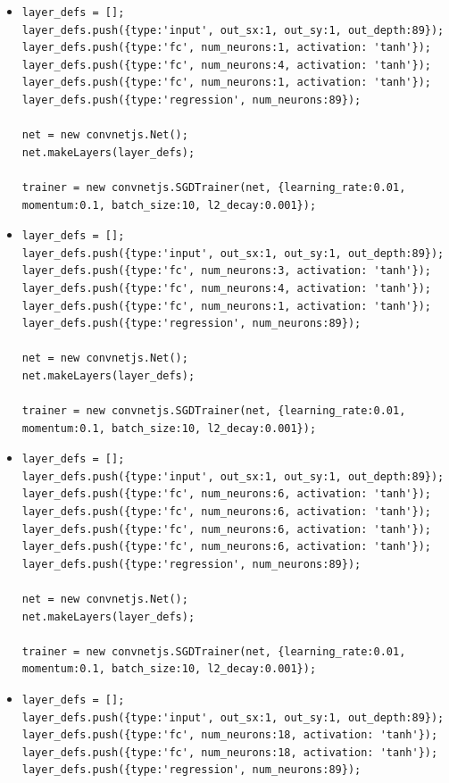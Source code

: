 \begin{itemize}
\item \begin{verbatim}
layer_defs = [];
layer_defs.push({type:'input', out_sx:1, out_sy:1, out_depth:89});
layer_defs.push({type:'fc', num_neurons:1, activation: 'tanh'});
layer_defs.push({type:'fc', num_neurons:4, activation: 'tanh'});
layer_defs.push({type:'fc', num_neurons:1, activation: 'tanh'});
layer_defs.push({type:'regression', num_neurons:89});

net = new convnetjs.Net();
net.makeLayers(layer_defs);

trainer = new convnetjs.SGDTrainer(net, {learning_rate:0.01, 
momentum:0.1, batch_size:10, l2_decay:0.001});
\end{verbatim}

\item \begin{verbatim}
layer_defs = [];
layer_defs.push({type:'input', out_sx:1, out_sy:1, out_depth:89});
layer_defs.push({type:'fc', num_neurons:3, activation: 'tanh'});
layer_defs.push({type:'fc', num_neurons:4, activation: 'tanh'});
layer_defs.push({type:'fc', num_neurons:1, activation: 'tanh'});
layer_defs.push({type:'regression', num_neurons:89});

net = new convnetjs.Net();
net.makeLayers(layer_defs);

trainer = new convnetjs.SGDTrainer(net, {learning_rate:0.01, 
momentum:0.1, batch_size:10, l2_decay:0.001});
\end{verbatim}


\item \begin{verbatim}
layer_defs = [];
layer_defs.push({type:'input', out_sx:1, out_sy:1, out_depth:89});
layer_defs.push({type:'fc', num_neurons:6, activation: 'tanh'});
layer_defs.push({type:'fc', num_neurons:6, activation: 'tanh'});
layer_defs.push({type:'fc', num_neurons:6, activation: 'tanh'});
layer_defs.push({type:'fc', num_neurons:6, activation: 'tanh'});
layer_defs.push({type:'regression', num_neurons:89});

net = new convnetjs.Net();
net.makeLayers(layer_defs);

trainer = new convnetjs.SGDTrainer(net, {learning_rate:0.01, 
momentum:0.1, batch_size:10, l2_decay:0.001});
\end{verbatim}

\item \begin{verbatim}
layer_defs = [];
layer_defs.push({type:'input', out_sx:1, out_sy:1, out_depth:89});
layer_defs.push({type:'fc', num_neurons:18, activation: 'tanh'});
layer_defs.push({type:'fc', num_neurons:18, activation: 'tanh'});
layer_defs.push({type:'regression', num_neurons:89});


\end{verbatim}
\end{itemize}
